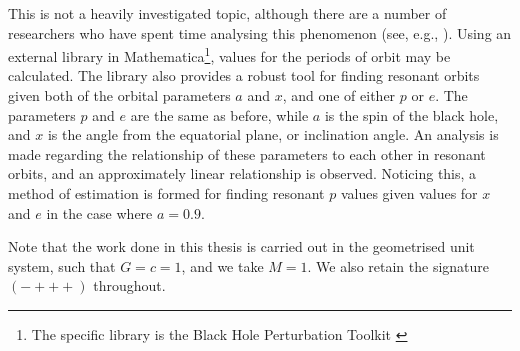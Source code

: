 This is not a heavily investigated topic, although there are a number of researchers who have spent time analysing this phenomenon (see, e.g., \cite{brinkResonance, brinkKerrResonance, ruangsriCensusReso, meentEMRIReso}).
Using an external library in Mathematica\footnote{The specific library is the Black Hole Perturbation Toolkit \cite{BHPToolkit}}, values for the periods of orbit may be calculated.
The library also provides a robust tool for finding resonant orbits given both of the orbital parameters $a$ and $x$, and one of either $p$ or $e$.
The parameters $p$ and $e$ are the same as before, while $a$ is the spin of the black hole, and $x$ is the angle from the equatorial plane, or inclination angle.
An analysis is made regarding the relationship of these parameters to each other in resonant orbits, and an approximately linear relationship is observed.
Noticing this, a method of estimation is formed for finding resonant $p$ values given values for $x$ and $e$ in the case where $a=0.9$.

Note that the work done in this thesis is carried out in the geometrised unit system, such that $G=c=1$, and we take $M=1$. We also retain the signature $(-+++)$ throughout.